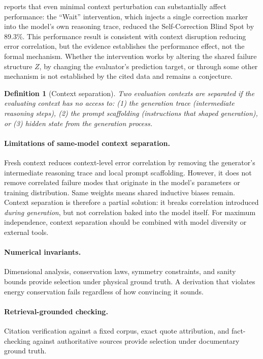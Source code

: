\documentclass[11pt]{article}
\newtheorem{definition}[theorem]{Definition}
\begin{document}
\citet{tsui2025selfcorrection} reports that even minimal context perturbation can
substantially affect performance: the ``Wait'' intervention, which injects a single
correction marker into the model's own reasoning trace, reduced the Self-Correction Blind
Spot by 89.3\%. This performance result is consistent with context disruption reducing
error correlation, but the evidence establishes the performance effect, not the formal
mechanism. Whether the intervention works by altering the shared failure structure $Z$,
by changing the evaluator's prediction target, or through some other mechanism is not
established by the cited data and remains a conjecture.

\begin{definition}[Context separation]
\label{def:context_sep}
Two evaluation contexts are \emph{separated} if the evaluating context has no access to:
(1) the generation trace (intermediate reasoning steps), (2) the prompt scaffolding
(instructions that shaped generation), or (3) hidden state from the generation process.
\end{definition}

\paragraph{Limitations of same-model context separation.} Fresh context reduces
context-level error correlation by removing the generator's intermediate reasoning trace and
local prompt scaffolding. However, it does not remove correlated failure modes that originate
in the model's parameters or training distribution. Same weights means shared inductive
biases remain. Context separation is therefore a partial solution: it breaks correlation
introduced \textit{during generation}, but not correlation baked into the model itself. For
maximum independence, context separation should be combined with model diversity or external
tools.

\paragraph{Numerical invariants.} Dimensional analysis, conservation laws, symmetry
constraints, and sanity bounds provide selection under physical ground truth. A derivation
that violates energy conservation fails regardless of how convincing it sounds.

\paragraph{Retrieval-grounded checking.} Citation verification against a fixed corpus, exact
quote attribution, and fact-checking against authoritative sources provide selection under
documentary ground truth.
\end{document}

